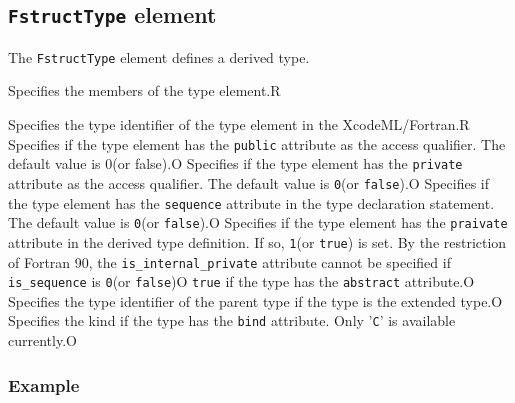 \subsection{ {\tt FstructType} element}

The {\tt FstructType} element defines a derived type.


\begin{XcodeMLChildElements}
{Specifies the members of the type element.}{R}
\end{XcodeMLChildElements}

\begin{XcodeMLAttributes}
{Specifies the type identifier of the type element in the XcodeML/Fortran.}{R}
{Specifies if the type element has the {\tt public} attribute as the access qualifier.
The default value is 0(or false).}{O}
{Specifies if the type element has the {\tt private} attribute as the access qualifier.
The default value is {\tt 0}(or {\tt false}).}{O}
{Specifies if the type element has the {\tt sequence} attribute in the type declaration statement.
The default value is {\tt 0}(or {\tt false}).}{O}
{Specifies if the type element has the {\tt praivate} attribute in the derived type definition. If so, {\tt 1}(or {\tt true}) is set.
By the restriction of Fortran 90, the {\tt is\_internal\_private} attribute cannot be specified if {\tt is\_sequence} is {\tt 0}(or {\tt false})}{O}
{{\tt true} if the type has the {\tt abstract} attribute.}{O}
{Specifies the type identifier of the parent type if the type is the extended type.}{O}
{Specifies the kind if the type has the {\tt bind} attribute. Only '{\tt C}' is available currently.}{O}
\end{XcodeMLAttributes}

\subsubsection*{Example}

